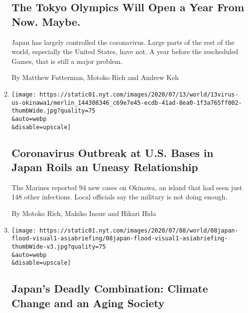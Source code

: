\begin{enumerate}
  \hypertarget{the-tokyo-olympics-will-open-a-year-from-now-maybe}{%
  \subsection{The Tokyo Olympics Will Open a Year From Now.
  Maybe.}\label{the-tokyo-olympics-will-open-a-year-from-now-maybe}}

  Japan has largely controlled the coronavirus. Large parts of the rest
  of the world, especially the United States, have not. A year before
  the rescheduled Games, that is still a major problem.

  By Matthew Futterman, Motoko Rich and Andrew Keh
\item
  \href{/2020/07/13/world/asia/coronavirus-military-okinawa.html}{}

  \texttt{[image: https://static01.nyt.com/images/2020/07/13/world/13virus-us-okinawa1/merlin\_144308346\_c69e7e45-ecdb-41ad-8ea0-1f3a765ff002-thumbWide.jpg?quality=75\\\&auto=webp\\\&disable=upscale]}

  \hypertarget{coronavirus-outbreak-at-us-bases-in-japan-roils-an-uneasy-relationship}{%
  \subsection{Coronavirus Outbreak at U.S. Bases in Japan Roils an
  Uneasy
  Relationship}\label{coronavirus-outbreak-at-us-bases-in-japan-roils-an-uneasy-relationship}}

  The Marines reported 94 new cases on Okinawa, an island that had seen
  just 148 other infections. Local officials say the military is not
  doing enough.

  By Motoko Rich, Makiko Inoue and Hikari Hida
\item
  \href{/2020/07/09/world/asia/japan-climate-change-rains-elderly.html}{}

  \texttt{[image: https://static01.nyt.com/images/2020/07/08/world/08japan-flood-visual1-asiabriefing/08japan-flood-visual1-asiabriefing-thumbWide-v3.jpg?quality=75\\\&auto=webp\\\&disable=upscale]}

  \hypertarget{japans-deadly-combination-climate-change-and-an-aging-society}{%
  \subsection{Japan's Deadly Combination: Climate Change and an Aging
  Society}\label{japans-deadly-combination-climate-change-and-an-aging-society}}


\end{enumerate}
